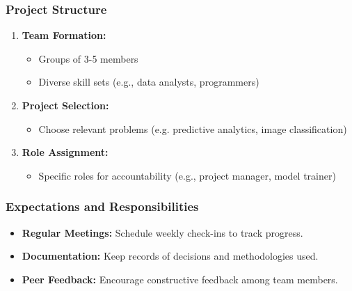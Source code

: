 \documentclass[aspectratio=169]{beamer}
\begin{document}
\begin{frame}
    \frametitle{Project Structure}
    \begin{enumerate}
        \item \textbf{Team Formation:}
            \begin{itemize}
                \item Groups of 3-5 members 
                \item Diverse skill sets (e.g., data analysts, programmers)
            \end{itemize}
        \item \textbf{Project Selection:}
            \begin{itemize}
                \item Choose relevant problems (e.g. predictive analytics, image classification)
            \end{itemize}
        \item \textbf{Role Assignment:}
            \begin{itemize}
                \item Specific roles for accountability (e.g., project manager, model trainer)
            \end{itemize}
    \end{enumerate}
\end{frame}

\begin{frame}
    \frametitle{Expectations and Responsibilities}
    \begin{itemize}
        \item \textbf{Regular Meetings:} Schedule weekly check-ins to track progress.
        \item \textbf{Documentation:} Keep records of decisions and methodologies used.
        \item \textbf{Peer Feedback:} Encourage constructive feedback among team members.
    \end{itemize}
\end{frame}
\end{document}
